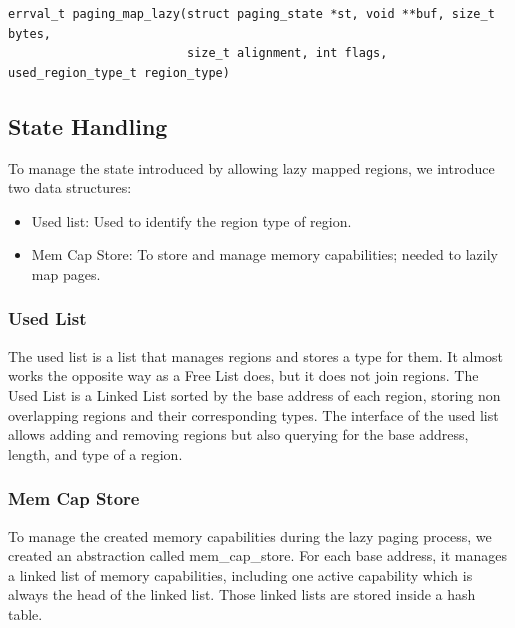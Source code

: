 \begin{verbatim}
errval_t paging_map_lazy(struct paging_state *st, void **buf, size_t bytes,
                         size_t alignment, int flags, used_region_type_t region_type)
\end{verbatim}

\subsection{State Handling}

To manage the state introduced by allowing lazy mapped regions, we introduce two data structures:
\begin{itemize}
    \item Used list: Used to identify the region type of region.
    \item Mem Cap Store: To store and manage memory capabilities; needed to lazily map pages.
\end{itemize}

\subsubsection{Used List}
The used list is a list that manages regions and stores a type for them. It almost works the opposite way as a Free List does, but it does not join regions. The Used List is a Linked List sorted by the base address of each region, storing non overlapping regions and their corresponding types.
The interface of the used list allows adding and removing regions but also querying for the base address, length, and type of a region.

\subsubsection{Mem Cap Store}
To manage the created memory capabilities during the lazy paging process, we created an abstraction called mem\_cap\_store. For each base address, it manages a linked list of memory capabilities, including one active capability which is always the head of the linked list. Those linked lists are stored inside a hash table.

